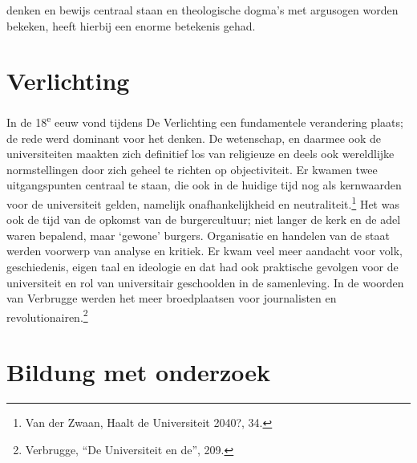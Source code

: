 \documentclass[empirical, authordate, ]{new-jote-article}
\begin{document}
denken en bewijs centraal staan en theologische dogma's met argusogen worden bekeken, heeft hierbij een enorme betekenis gehad.



	\section{Verlichting}



	In de 18\textsuperscript{e} eeuw vond tijdens De Verlichting een fundamentele verandering plaats; de rede werd dominant voor het denken. De wetenschap, en daarmee ook de universiteiten maakten zich definitief los van religieuze en deels ook wereldlijke normstellingen door zich geheel te richten op objectiviteit. Er kwamen twee uitgangspunten centraal te staan, die ook in de huidige tijd nog als kernwaarden voor de universiteit gelden, namelijk onafhankelijkheid en neutraliteit.\footnote{Van der Zwaan, Haalt de Universiteit 2040?, 34.} Het was ook de tijd van de opkomst van de burgercultuur; niet langer de kerk en de adel waren bepalend, maar ‘gewone' burgers. Organisatie en handelen van de staat werden voorwerp van analyse en kritiek. Er kwam veel meer aandacht voor volk, geschiedenis, eigen taal en ideologie en dat had ook praktische gevolgen voor de universiteit en rol van universitair geschoolden in de samenleving. In de woorden van Verbrugge werden het meer broedplaatsen voor journalisten en revolutionairen.\footnote{Verbrugge, “De Universiteit en de”, 209.}



	\section{Bildung met onderzoek}
\end{document}
